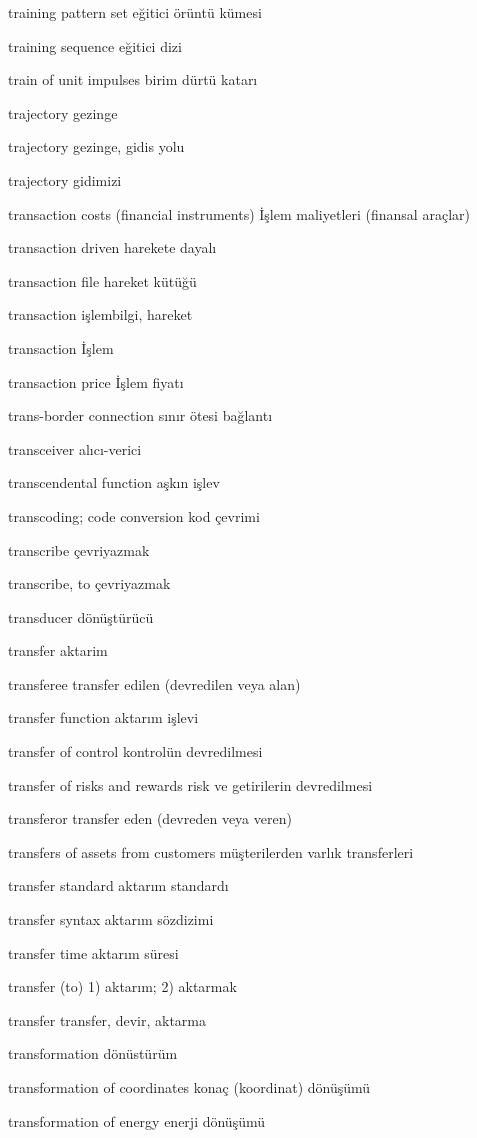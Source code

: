 \documentclass[12pt,fleqn]{article}\usepackage{../../common}
\begin{document}
training pattern set eğitici örüntü kümesi

training sequence eğitici dizi

train of unit impulses birim dürtü katarı

trajectory gezinge

trajectory gezinge, gidis yolu

trajectory gidimizi

transaction costs (financial instruments) İşlem maliyetleri (finansal araçlar)

transaction driven harekete dayalı

transaction file hareket kütüğü

transaction işlembilgi, hareket

transaction İşlem

transaction price İşlem fiyatı

trans-border connection sınır ötesi bağlantı

transceiver alıcı-verici

transcendental function aşkın işlev

transcoding; code conversion kod çevrimi

transcribe çevriyazmak

transcribe, to çevriyazmak

transducer dönüştürücü

transfer aktarim

transferee transfer edilen (devredilen veya alan)

transfer function aktarım işlevi

transfer of control kontrolün devredilmesi

transfer of risks and rewards risk ve getirilerin devredilmesi

transferor transfer eden (devreden veya veren)

transfers of assets from customers müşterilerden varlık transferleri

transfer standard aktarım standardı

transfer syntax aktarım sözdizimi

transfer time aktarım süresi

transfer (to) 1) aktarım; 2) aktarmak

transfer transfer, devir, aktarma

transformation dönüstürüm

transformation of coordinates konaç (koordinat) dönüşümü

transformation of energy enerji dönüşümü
\end{document}

